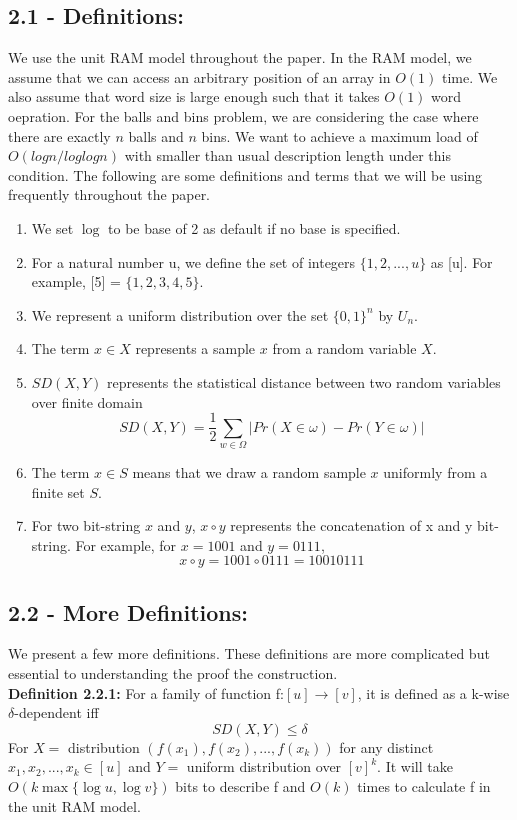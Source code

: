 \documentclass[a4paper, english]{paper}
\begin{document}
	\subsection{2.1 - Definitions:}
	We use the unit RAM model throughout the paper. In the RAM model, we assume that we can access an arbitrary position of an array in $O(1)$ time. We also assume that word size is large enough such that it takes $O(1)$ word oepration. For the balls and bins problem, we are considering the case where there are exactly $n$ balls and $n$ bins. We want to achieve a maximum load of $O(log n/ log log n)$ with smaller than usual description length under this condition. The following are some definitions and terms that we will be using frequently throughout the paper.
	\begin{enumerate}
	\item We set $\log$ to be base of 2 as default if no base is specified. 
	\item For a natural number u, we define the set of integers $\{1, 2, ..., u\}$ as [u].  For example, [5] = $\{1,2,3,4,5\}$.
	\item We represent a uniform distribution over the set $\{0, 1\}^n$ by $U_n$.
	\item The term $x \in X$ represents a sample $x$ from a random variable $X$.
	\item  $SD(X, Y)$ represents the statistical distance between two random variables over finite domain
		$$SD(X, Y) = \frac{1}{2}\sum_{w\in \Omega}| Pr(X\in \omega) - Pr(Y\in \omega)|$$
	\item The term $x \in S$ means that we draw a random sample $x$ uniformly from a finite set $S$.
	\item For two bit-string $x$ and $y$, $x \circ y$ represents the concatenation of x and y bit-string. For example, for $x = 1001$ and $y = 0111$, 
		$$x \circ y = 1001 \circ 0111 = 10010111$$
	\end{enumerate}
	
	\subsection{2.2 - More Definitions:}
	We present a few more definitions. These definitions are more complicated but essential to understanding the proof the construction. \\
	
	\noindent\textbf{Definition 2.2.1:} 
	For a family of function f:$[u]\rightarrow[v]$, it is defined as  a k-wise $\delta$-dependent iff
		$$SD(X,Y)\le \delta$$
	For $X= $ distribution $(f(x_1),f(x_2),...,f(x_k))$ for any distinct $x_1,x_2,...,x_k\in[u]$ and $Y=$ uniform distribution over $[v]^k$.
	It will take $O(k\max\{\log u, \log v\})$ bits to describe f and $O(k)$ times to calculate f in the unit RAM model.\\
\end{document}
